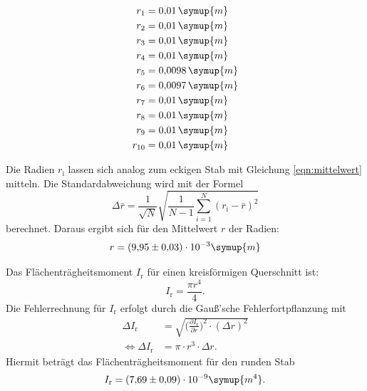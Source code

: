 \begin{equation*}
\begin{aligned}
r_1 &= 0{,}01\, \symup{m} \\
r_2 &= 0{,}01\, \symup{m} \\
r_3 &= 0{,}01\, \symup{m} \\
r_4 &= 0{,}01\, \symup{m} \\
r_5 &= 0{,}0098\, \symup{m} \\
r_6 &= 0{,}0097\, \symup{m} \\
r_7 &= 0{,}01\, \symup{m} \\
r_8 &= 0{,}01\, \symup{m} \\
r_9 &= 0{,}01\, \symup{m} \\
r_{10} &= 0{,}01\, \symup{m} \\
\end{aligned}
\end{equation*}

Die Radien $r_{\text{i}}$ lassen sich analog zum eckigen Stab mit Gleichung \eqref{eqn:mittelwert} mitteln.
Die Standardabweichung wird mit der Formel
\begin{equation*}
\Delta \bar{r} = \frac{1}{\sqrt{N}} \sqrt{\frac{1}{N-1} \sum_{i=1}^N (r_{\text{i}} - \bar{r})^2}
\end{equation*}
berechnet. Daraus ergibt sich für den Mittelwert $r$ der Radien:
\begin{equation*}
r = (9{,}95 \pm 0{,}03)\cdot 10^{-3} \symup{m}
\end{equation*}

Das Flächenträgheitsmoment $I_{\text{r}}$ \cite{flaeche} für einen kreisförmigen Querschnitt ist:
\begin{equation*}
I_{\text{r}} = \frac{\pi r^4}{4}.
\end{equation*}
Die Fehlerrechnung für $I_{\text{r}}$ erfolgt durch die Gauß'sche Fehlerfortpflanzung mit
\begin{equation*}
\begin{aligned}
\Delta I_{\text{r}} &= \sqrt{\biggl(\frac{\partial I_{\text{r}}}{\partial r}\biggr)^2\cdot (\Delta r)^2} \\
\iff \Delta I_{\text{r}} &= \pi \cdot r^3 \cdot \Delta r.
\end{aligned}
\end{equation*}
Hiermit beträgt das Flächenträgheitsmoment für den runden Stab
\begin{equation*}
I_{\text{r}} = (7{,}69 \pm 0{,}09)\cdot 10^{-9} \symup{m^4}.
\end{equation*}

